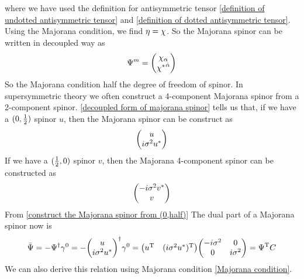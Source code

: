 where we have used the definition for antisymmetric tensor \eqref{definition of undotted antisymmetric tensor} and \eqref{definition of dotted antisymmetric tensor}. Using the Majorana condition, we find $\eta = \chi$. So the Majorana spinor can be written in decoupled way as
\begin{equation}\label{decoupled form of majorana spinor}
\Psi^{m} = \mqty(\chi_{\a} \\ \lc^{\doa})
\end{equation}
So the Majorana condition half the degree of freedom of spinor. 
In supersymmetric theory we often construct a 4-component Majorana spinor from a 2-component spinor. \eqref{decoupled form of majorana spinor} tells us that, if we have a $(0,\frac{1}{2})$ spinor $u$, then the Majorana spinor can be construct as
\begin{equation}\label{construct the Majorana spinor from (0,half)}
\mqty(u \\ i\s^{2}u^*)
\end{equation}
If we have a $(\frac{1}{2},0)$ spinor $v$, then the Majorana 4-component spinor can be constructed as
\begin{equation}
\mqty(-i\s^{2}v^*\\v)
\end{equation}
From \eqref{construct the Majorana spinor from (0,half)}
The dual part of a Majorana spinor now is
\begin{equation}
\bar{\Psi}
=-\Psi^{\dagger}\g^{0}
= -\mqty(u \\ i\s^{2}u^*)^{\dagger}\g^{0}
=\mqty(u^{\tra} & (i\s^{2}u^{*})^{\tra})
\mqty(-i\s^2 & 0 \\
      0     & i\s^2)
=\Psi^{\tra}C 
\end{equation} 
We can also derive this relation using Majorana condition \eqref{Majorana condition}.

